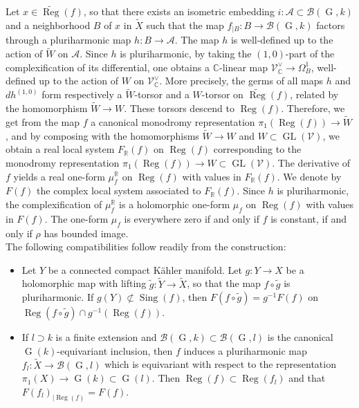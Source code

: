 \documentclass[11pt,letterpaper]{amsart}
\def\bR{\mathbb{R}}
\def\bC{\mathbb{C}}
\def\cA{\mathcal{A}}
\def\cV{\mathcal{V}}
\theoremstyle{plain}
\DeclareMathOperator{\rG}{G}
\DeclareMathOperator{\GL}{GL}
\DeclareMathOperator{\Sing}{Sing}
\DeclareMathOperator{\Reg}{Reg}
\begin{document}
Let $x \in \widetilde{\Reg}(f)$, so that there exists an isometric embedding $i \colon \cA \subset \mathscr{B}(\rG, k)$ and a neighborhood $B$ of $x$ in $\tilde{X}$ such that the map $f_{|B} \colon B \to \mathscr{B}(\rG, k)$ factors through a pluriharmonic map $h \colon B \to \cA$. The map $h$ is well-defined up to the action of $\tilde W$ on $\cA$. Since $h$ is pluriharmonic, by taking the $(1,0)$-part of the complexification of its differential, one obtains a $\bC$-linear map $\cV_{\bC}^\vee \to \Omega^1_B$, well-defined up to the action of $W$ on $\cV_{\bC}^\vee$. More precisely, the germs of all maps $h$ and $dh^{(1,0)}$ form respectively a $\tilde W$-torsor and a $W$-torsor on $\widetilde{\Reg}(f)$, related by the homomorphism $\tilde W \to W$. These torsors descend to $\Reg(f)$. Therefore, we get from the map $f$ a canonical monodromy representation $\pi_1(\Reg(f)) \to \tilde W$, and by composing with the homomorphisms $\tilde W \to W$ and $W \subset \GL(\cV)$, we obtain a real local system $F_{\bR}(f)$ on $\Reg(f)$ corresponding to the monodromy representation $\pi_1(\Reg(f)) \to W \subset \GL(\cV)$. The derivative of $f$ yields a real one-form $\mu^{\bR}_f$ on $\Reg(f)$ with values in $F_{\bR}(f)$. We denote by $F(f)$ the complex local system associated to $F_{\bR}(f)$. Since $h$ is pluriharmonic, the complexification of $\mu^{\bR}_f$ is a holomorphic one-form $\mu_f$ on $\Reg(f)$ with values in $F(f)$. The one-form $\mu_f$ is everywhere zero if and only if $f$ is constant, if and only if $\rho$ has bounded image.\\

The following compatibilities follow readily from the construction: 
\begin{itemize}
    \item Let $Y$ be a connected compact K\"ahler manifold. Let $g \colon Y \to X$ be a holomorphic map with lifting $\tilde g \colon \tilde Y \to \tilde X$, so that the map $f \circ \tilde g$ is pluriharmonic. If $g(Y) \not \subset \Sing(f)$, then $F(f \circ \tilde g) = g^{-1} F(f)$ on $\Reg(f \circ \tilde g) \cap g^{-1} \left( \Reg(f) \right)$.
\item If $l \supset k$ is a finite extension and $\mathscr{B}(\rG, k) \subset \mathscr{B}(\rG, l)$ is the canonical $\rG(k)$-equivariant inclusion, then $f$ induces a pluriharmonic map $f_l \colon \tilde X \to \mathscr{B}(\rG, l)$ which is equivariant with respect to the representation $\pi_1(X) \to \rG(k) \subset \rG(l)$. Then $\Reg(f) \subset \Reg(f_l)$ and that $F(f_l)_{|\Reg(f)} = F(f)$.
\end{itemize}
\end{document}
